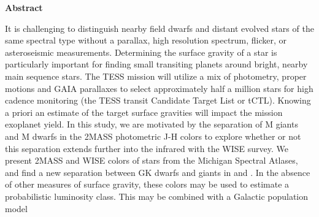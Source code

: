 {}
\vspace*{\fill}
\begin{center}
\textbf{Abstract}

It is challenging to distinguish nearby field dwarfs and distant evolved stars of the same spectral type without a parallax, high resolution spectrum, flicker, or asteroseismic measurements. Determining the surface gravity of a star is particularly important for finding small transiting planets around bright, nearby main sequence stars. The TESS mission will utilize a mix of photometry, proper motions and GAIA parallaxes to select approximately half a million stars for high cadence monitoring (the TESS transit Candidate Target List or tCTL). Knowing a priori an estimate of the target surface gravities will impact the mission exoplanet yield.  In this study, we are motivated by the separation of M giants and M dwarfs in the 2MASS photometric J-H colors to explore whether or not this separation extends further into the infrared with the WISE survey.  We present 2MASS and WISE colors of stars from the Michigan Spectral Atlases, and find a new separation between GK dwarfs and giants in \jwone and \jwtwo.  In the absence of other measures of surface gravity, these colors may be used to estimate a probabilistic luminosity class.  This may be combined with a Galactic population model 


\end{center}
\vspace{\fill}
